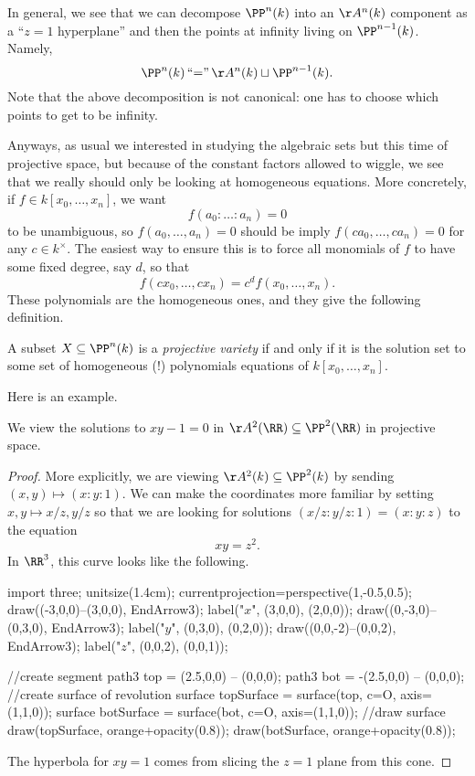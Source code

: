 In general, we see that we can decompose $\PP^n(k)$ into an $\AA^n(k)$ component as a ``$z=1$ hyperplane'' and then the points at infinity living on $\PP^{n-1}(k)$. Namely,
\[\PP^n(k)\,\text{``}{=}\text{''}\,\AA^n(k)\sqcup\PP^{n-1}(k).\]
Note that the above decomposition is not canonical: one has to choose which points to get to be infinity.

Anyways, as usual we interested in studying the algebraic sets but this time of projective space, but because of the constant factors allowed to wiggle, we see that we really should only be looking at homogeneous equations. More concretely, if $f\in k[x_0,\ldots,x_n]$, we want
\[f(a_0:\ldots:a_n)=0\]
to be unambiguous, so $f(a_0,\ldots,a_n)=0$ should be imply $f(ca_0,\ldots,ca_n)=0$ for any $c\in k^\times$. The easiest way to ensure this is to force all monomials of $f$ to have some fixed degree, say $d$, so that
\[f(cx_0,\ldots,cx_n)=c^df(x_0,\ldots,x_n).\]
These polynomials are the homogeneous ones, and they give the following definition.
\begin{definition}
	A subset $X\subseteq\PP^n(k)$ is a \textit{projective variety} if and only if it is the solution set to some set of homogeneous (!) polynomials equations of $k[x_0,\ldots,x_n]$.
\end{definition}
Here is an example.
\begin{exe}
	We view the solutions to $xy-1=0$ in $\AA^2(\RR)\subseteq\PP^2(\RR)$ in projective space.
\end{exe}
\begin{proof}
	More explicitly, we are viewing $\AA^2(k)\subseteq\PP^2(k)$ by sending $(x,y)\mapsto(x:y:1)$. We can make the coordinates more familiar by setting $x,y\mapsto x/z,y/z$ so that we are looking for solutions $(x/z:y/z:1)=(x:y:z)$ to the equation
	\[xy=z^2.\]
	In $\RR^3$, this curve looks like the following.
	\begin{center}
		\begin{asy}
			import three;
			unitsize(1.4cm);
			currentprojection=perspective(1,-0.5,0.5);
			draw((-3,0,0)--(3,0,0), EndArrow3);
			label("$x$", (3,0,0), (2,0,0));
			draw((0,-3,0)--(0,3,0), EndArrow3);
			label("$y$", (0,3,0), (0,2,0));
			draw((0,0,-2)--(0,0,2), EndArrow3);
			label("$z$", (0,0,2), (0,0,1));
			
			//create segment
			path3 top = (2.5,0,0) -- (0,0,0);
			path3 bot = -(2.5,0,0) -- (0,0,0);
			//create surface of revolution
			surface topSurface = surface(top, c=O, axis=(1,1,0));
			surface botSurface = surface(bot, c=O, axis=(1,1,0));
			//draw surface
			draw(topSurface, orange+opacity(0.8));
			draw(botSurface, orange+opacity(0.8));
		\end{asy}
	\end{center}
	The hyperbola for $xy=1$ comes from slicing the $z=1$ plane from this cone.
\end{proof}

